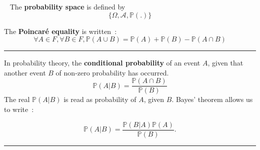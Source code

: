\begin{f}[Axiomatic]{\ }
	The \textbf{probability space} is defined by
	\[ \lbrace \Omega, \mathcal{A}, \mathbb{P}(.) \rbrace \]
	
	The \textbf{Poincaré equality} is written~:
	\[\forall A \in F, \forall B \in F, \mathbb{P} (A \cup B) = \mathbb{P} (A) + \mathbb{P} (B) - \mathbb{P} (A \cap B)\]
	
\end{f}
\hrule

\begin{f}[Bayes]
	In probability theory, the \textbf{conditional probability} of an event \(A\), given that another event \(B\) of non-zero probability has occurred.
	\[
	\mathbb{P}(A|B) = \frac{\mathbb{P}(A \cap B)}{\mathbb{P}(B)}
	\]
	The real \(\mathbb{P}(A|B)\) is read as probability of \(A\), given \(B\).
	Bayes' theorem allows us to write~:
	
	\[   \mathbb{P}(A|B) = \frac{\mathbb{P}(B|A)\mathbb{P}(A)}{\mathbb{P}(B)}. \]
\end{f}
\hrule

